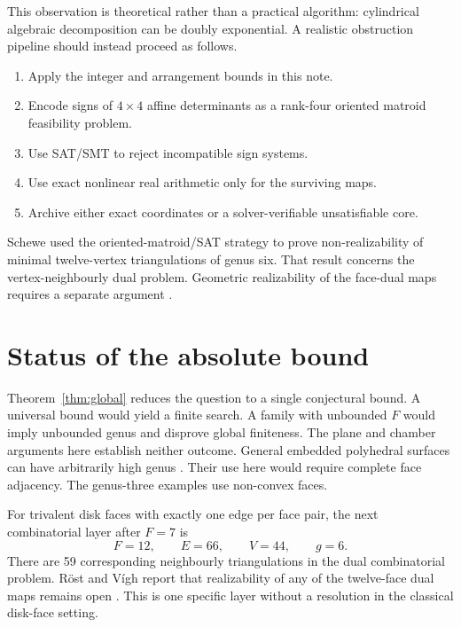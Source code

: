 \documentclass[11pt,a4paper]{article}
\theoremstyle{definition}
\begin{document}
This observation is theoretical rather than a practical algorithm: cylindrical
algebraic decomposition can be doubly exponential.  A realistic obstruction
pipeline should instead proceed as follows.
\begin{enumerate}
\item Apply the integer and arrangement bounds in this note.
\item Encode signs of $4\times4$ affine determinants as a rank-four oriented
      matroid feasibility problem.
\item Use SAT/SMT to reject incompatible sign systems.
\item Use exact nonlinear real arithmetic only for the surviving maps.
\item Archive either exact coordinates or a solver-verifiable unsatisfiable
      core.
\end{enumerate}
Schewe used the oriented-matroid/SAT strategy to prove non-realizability of
minimal twelve-vertex triangulations of genus six.  That result concerns the
vertex-neighbourly dual problem. Geometric realizability of the face-dual
maps requires a separate argument \cite{Schewe2010,RostVigh2026}.

\section{Status of the absolute bound}

Theorem~\ref{thm:global} reduces the question to a single conjectural
bound. A universal bound would yield a finite search. A family with
unbounded $F$ would imply unbounded genus and disprove global finiteness.
The plane and chamber arguments here establish neither outcome.
General embedded polyhedral surfaces can have arbitrarily high genus
\cite{Ziegler2005}. Their use here would require complete face adjacency.
The genus-three examples \cite{Mizhaev2026,RostVigh2026} use non-convex faces.

For trivalent disk faces with exactly one edge per face pair, the next
combinatorial layer after $F=7$ is
\[
  F=12,\qquad E=66,\qquad V=44,\qquad g=6.
\]
There are 59 corresponding neighbourly triangulations in the dual
combinatorial problem. R\"ost and V\'igh report that realizability of any
of the twelve-face dual maps remains open \cite{RostVigh2026}. This is one
specific layer without a resolution in the classical disk-face setting.
\end{document}
